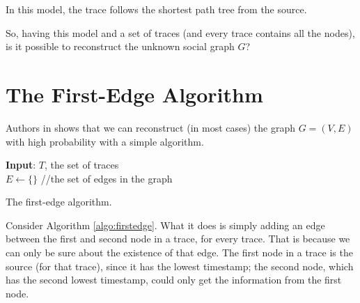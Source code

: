In this model, the trace follows the shortest path tree from the source.

So, having this model and a set of traces (and every trace contains all the nodes), is it possible to reconstruct the unknown social graph $G$? 

\section{The First-Edge Algorithm}
Authors in \cite{KDD13} shows that we can reconstruct (in most cases) the graph $G=(V, E)$ with high probability with a simple algorithm.
 
\begin{algorithm}
	\textbf{Input}: $T$, the set of traces\\
	$E \gets \{\}$ //the set of edges in the graph \;
	\caption{The first-edge algorithm.}
	\label{algo:firstedge}
\end{algorithm}

 Consider Algorithm \ref{algo:firstedge}. What it does is simply adding an edge between the first and second node in a trace, for every trace. That is because we can only be sure about the existence of that edge. The first node in a trace is the source (for that trace), since it has the lowest timestamp; the second node, which has the second lowest timestamp, could only get the information from the first node.
 
